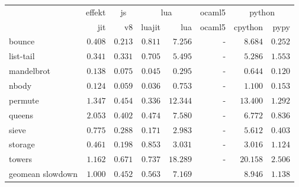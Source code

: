\begin{tabular}{l r r r r r r r}
\toprule & \multicolumn{1}{c}{effekt} & \multicolumn{1}{c}{js} & \multicolumn{2}{c}{lua} & \multicolumn{1}{c}{ocaml5} & \multicolumn{2}{c}{python} \\
\cmidrule(l){2-2}\cmidrule(l){3-3}\cmidrule(l){4-5}\cmidrule(l){6-6}\cmidrule(l){7-8} 
 & jit & v8 & luajit & lua & ocaml5 & cpython & pypy \\
\midrule
bounce & $0.408$ & $\mathbf{0.213}$ & $0.811$ & $7.256$ & - & $8.684$ & $0.252$ \\
list-tail & $0.341$ & $\mathbf{0.331}$ & $0.705$ & $5.495$ & - & $5.286$ & $1.553$ \\
mandelbrot & $0.138$ & $0.075$ & $\mathbf{0.045}$ & $0.295$ & - & $0.644$ & $0.120$ \\
nbody & $0.124$ & $0.059$ & $\mathbf{0.036}$ & $0.753$ & - & $1.100$ & $0.153$ \\
permute & $1.347$ & $0.454$ & $\mathbf{0.336}$ & $12.344$ & - & $13.400$ & $1.292$ \\
queens & $2.053$ & $\mathbf{0.402}$ & $0.474$ & $7.580$ & - & $6.772$ & $0.836$ \\
sieve & $0.775$ & $0.288$ & $\mathbf{0.171}$ & $2.983$ & - & $5.612$ & $0.403$ \\
storage & $0.461$ & $\mathbf{0.198}$ & $0.853$ & $3.031$ & - & $3.016$ & $1.124$ \\
towers & $1.162$ & $\mathbf{0.671}$ & $0.737$ & $18.289$ & - & $20.158$ & $2.506$ \\
\midrule
 geomean slowdown & $1.000$ & $0.452$ & $0.563$ & $7.169$ &  & $8.946$ & $1.138$ \\
\bottomrule
\end{tabular}